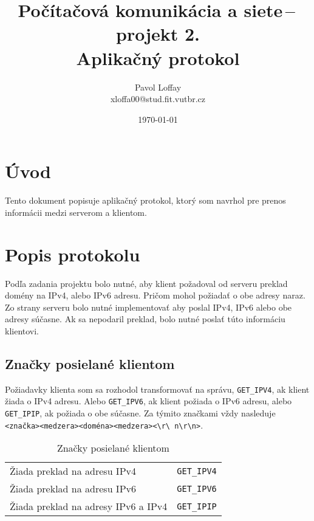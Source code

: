 \documentclass[10pt,a4paper]{article}
\begin{document}
\title{Počítačová komunikácia a siete\,--\,projekt 2. \\ Aplikačný protokol}
\author{Pavol Loffay\\xloffa00@stud.fit.vutbr.cz}
\date{\today}
\maketitle

\section{Úvod}
Tento dokument popisuje aplikačný protokol, ktorý som navrhol pre prenos 
informácii medzi serverom a klientom.

\section{Popis protokolu}
Podľa zadania projektu bolo nutné, aby klient požadoval od serveru
preklad domény na IPv4, alebo IPv6 adresu. Pričom mohol požiadať o obe adresy
naraz. Zo strany serveru bolo nutné implementovať aby poslal IPv4, IPv6 alebo
obe adresy súčasne. Ak sa nepodaril preklad, bolo nutné poslať túto informáciu
klientovi.

\subsection{Značky posielané klientom}
Požiadavky klienta som sa rozhodol transformovať na správu,
\texttt{GET\_IPV4}, ak klient žiada o IPv4 adresu. Alebo \texttt{GET\_IPV6}, ak
klient požiada o IPv6 adresu, alebo \texttt{GET\_IPIP}, ak požiada o obe súčasne.
Za týmito značkami vždy nasleduje
\texttt{<značka><medzera><doména><medzera><\textbackslash r\textbackslash
n\textbackslash r\textbackslash n>}. 

\begin{table}[h]
    \begin{center}
        \begin{tabular}{lc}
        Žiada preklad na adresu IPv4 & \texttt{GET\_IPV4} \\
        Žiada preklad na adresu IPv6 & \texttt{GET\_IPV6} \\
        Žiada preklad na adresy IPv6 a IPv4 & \texttt{GET\_IPIP}
        \end{tabular}
        \caption{Značky posielané klientom}
    \end{center}
\end{table}
\end{document}
